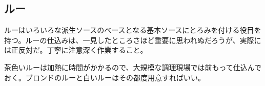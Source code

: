  

\begin{Main}

\hypertarget{roux}{%
\section{ルー}\label{roux}}


 

ルーはいろいろな派生ソースのベースとなる基本ソースにとろみを付ける役目を持つ。ルーの仕込みは、一見したところさほど重要に思われぬだろうが、実際には正反対だ。丁寧に注意深く作業すること。

茶色いルーは加熱に時間がかかるので、大規模な調理現場では前もって仕込んでおく。ブロンドのルーと白いルーはその都度用意すればいい。

\atoaki{}

\end{Main}

